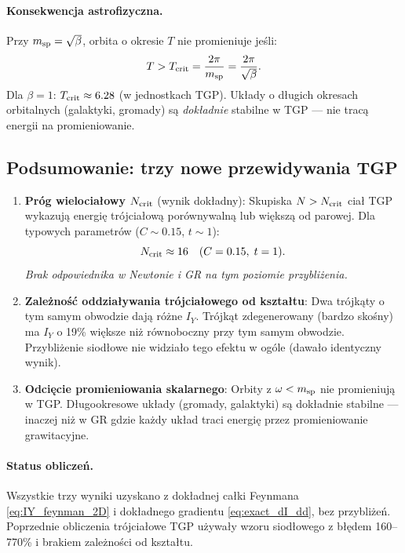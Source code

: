 \paragraph{Konsekwencja astrofizyczna.}
Przy $m_{\rm sp} = \sqrt{\beta}$, orbita o okresie $T$ nie promieniuje
jeśli:
\begin{equation}
T > T_{\rm crit} = \frac{2\pi}{m_{\rm sp}} = \frac{2\pi}{\sqrt{\beta}}.
\end{equation}
Dla $\beta = 1$: $T_{\rm crit} \approx 6.28$ (w jednostkach TGP).
Układy o długich okresach orbitalnych (galaktyki, gromady) są
\emph{dokładnie} stabilne w TGP — nie tracą energii na promieniowanie.

\subsection{Podsumowanie: trzy nowe przewidywania TGP}

\begin{enumerate}

\item \textbf{Próg wielociałowy $N_{\rm crit}$} (wynik dokładny):
  Skupiska $N > N_{\rm crit}$ ciał TGP wykazują energię trójciałową
  porównywalną lub większą od parowej. Dla typowych parametrów
  ($C \sim 0.15$, $t \sim 1$):
  \begin{equation}
  N_{\rm crit} \approx 16 \quad (C=0.15,\; t=1).
  \end{equation}
  \emph{Brak odpowiednika w Newtonie i GR na tym poziomie przybliżenia.}

\item \textbf{Zależność oddziaływania trójciałowego od kształtu}:
  Dwa trójkąty o tym samym obwodzie dają różne $I_Y$.
  Trójkąt zdegenerowany (bardzo skośny) ma $I_Y$ o 19\% większe
  niż równoboczny przy tym samym obwodzie. Przybliżenie siodłowe
  nie widziało tego efektu w ogóle (dawało identyczny wynik).

\item \textbf{Odcięcie promieniowania skalarnego}:
  Orbity z $\omega < m_{\rm sp}$ nie promieniują w TGP.
  Długookresowe układy (gromady, galaktyki) są dokładnie stabilne —
  inaczej niż w GR gdzie każdy układ traci energię przez promieniowanie
  grawitacyjne.

\end{enumerate}

\paragraph{Status obliczeń.}
Wszystkie trzy wyniki uzyskano z dokładnej całki Feynmana
\eqref{eq:IY_feynman_2D} i dokładnego gradientu \eqref{eq:exact_dI_dd},
bez przybliżeń. Poprzednie obliczenia trójciałowe TGP używały wzoru
siodłowego z błędem 160--770\% i brakiem zależności od kształtu.

